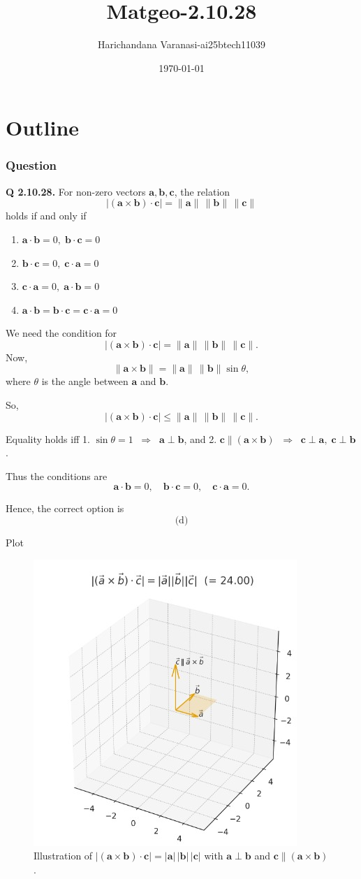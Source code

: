\documentclass{beamer}
\title{Matgeo-2.10.28}
\author{Harichandana Varanasi-ai25btech11039}
\date{\today}
\theoremstyle{remark}
\providecommand{\abs}[1]{\left\vert#1\right\vert}
\let\vec\mathbf
\begin{document}
\begin{frame}
\titlepage
\end{frame}

\section*{Outline}

\begin{frame}
\frametitle{Question}
\textbf{Q 2.10.28.}
For non-zero vectors $\vec a,\vec b,\vec c$, the relation
\[
\bigl|(\vec a\times \vec b)\cdot \vec c\bigr|=\|\vec a\|\,\|\vec b\|\,\|\vec c\|
\]
holds if and only if
\begin{enumerate}
  \item $\vec a\cdot\vec b=0,\; \vec b\cdot\vec c=0$
  \item $\vec b\cdot\vec c=0,\; \vec c\cdot\vec a=0$
  \item $\vec c\cdot\vec a=0,\; \vec a\cdot\vec b=0$
  \item $\vec a\cdot\vec b=\vec b\cdot\vec c=\vec c\cdot\vec a=0$
\end{enumerate}


\end{frame}
%
\begin{frame}

\begin{solution}
We need the condition for
\[
\abs{(\vec{a} \times \vec{b})\cdot \vec{c}} = \|\vec{a}\|\,\|\vec{b}\|\,\|\vec{c}\|.
\]
Now,
\[
\| \vec{a} \times \vec{b} \| = \|\vec{a}\|\,\|\vec{b}\|\sin\theta,
\]
where $\theta$ is the angle between $\vec{a}$ and $\vec{b}$.

So,
\[
\abs{(\vec{a} \times \vec{b})\cdot \vec{c}} 
\le \|\vec{a}\|\,\|\vec{b}\|\,\|\vec{c}\|.
\]

Equality holds iff  
1. $\sin\theta = 1 \;\;\Rightarrow\;\; \vec{a} \perp \vec{b}$, and  
2. $\vec{c} \parallel (\vec{a} \times \vec{b}) \;\;\Rightarrow\;\; \vec{c} \perp \vec{a},\;\vec{c} \perp \vec{b}$.  

Thus the conditions are
\[
\vec{a} \cdot \vec{b} = 0, \quad 
\vec{b} \cdot \vec{c} = 0, \quad 
\vec{c} \cdot \vec{a} = 0.
\]

Hence, the correct option is
\[
\boxed{\text{(d)}}
\]
\end{solution}

\end{frame}
\begin{frame}{Plot}
     \begin{figure}[h!]
\centering
\includegraphics[width=0.5\linewidth]{figs/2.10.28.jpeg}
\caption{Illustration of $|( \vec a\times\vec b)\cdot\vec c|=|\vec a|\,|\vec b|\,|\vec c|$ with $\vec a\perp\vec b$ and $\vec c\parallel(\vec a\times\vec b)$.}


\end{figure}
\end{frame}
\end{document}
